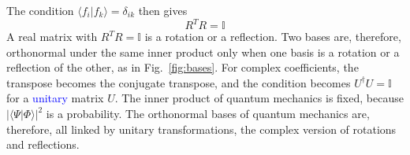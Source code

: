 \documentclass[11pt]{article}      %
\numberwithin{equation}{section}   %
\begin{document}
The condition $\langle f_i | f_k \rangle = \delta_{ik}$ then gives
\begin{equation}
    \boxed{R^{T} R = \mathbb{I}}
\end{equation}
A real matrix with $R^{T} R = \mathbb{I}$ is a rotation or a reflection. Two bases are, therefore, orthonormal under the same inner product only when one basis is a rotation or a reflection of the other, as in Fig.~\ref{fig:bases}. For complex coefficients, the transpose becomes the conjugate transpose, and the condition becomes $U^{\dagger} U = \mathbb{I}$ for a \textcolor{blue}{unitary} matrix $U$. The inner product of quantum mechanics is fixed, because $|\langle \Psi | \Phi \rangle|^2$ is a probability. The orthonormal bases of quantum mechanics are, therefore, all linked by unitary transformations, the complex version of rotations and reflections.
\end{document}
